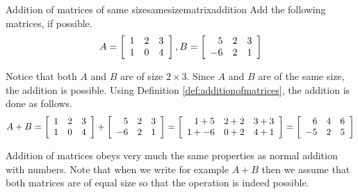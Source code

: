 \begin{example}{Addition of matrices of same size}{samesizematrixaddition}
Add the following matrices, if possible.
\begin{equation*}
A = \left[
\begin{array}{ccc}
1 & 2 & 3 \\
1 & 0 & 4
\end{array}
\right],
B = \left[
\begin{array}{rrr}
5 & 2 & 3 \\
-6 & 2 & 1
\end{array}
\right]
\end{equation*}
\end{example}

\begin{solution}
Notice that both $A$ and $B$ are of size $2 \times 3$. 
Since $A$ and $B$ are of the same size, the addition is possible. Using Definition \ref{def:additionofmatrices}, 
the addition is done as follows. 
\begin{equation*}
A + B = \left[
\begin{array}{rrr}
1 & 2 & 3 \\
1 & 0 & 4
\end{array}
\right]
+
\left[
\begin{array}{rrr}
5 & 2 & 3 \\
-6 & 2 & 1
\end{array}
\right]
=\allowbreak 
\left[
\begin{array}{rrr}
1+5 & 2+2 & 3+3 \\
1+ -6 & 0+2 & 4+1
\end{array}
\right]
=
\left[
\begin{array}{rrr}
6 & 4 & 6 \\
-5 & 2 & 5
\end{array}
\right]
\end{equation*}
\end{solution}

Addition of matrices obeys very much the same properties as normal
addition with numbers. Note that when we write for example $A+B$ then
we assume that both matrices are of equal size so that the operation
is indeed possible.

